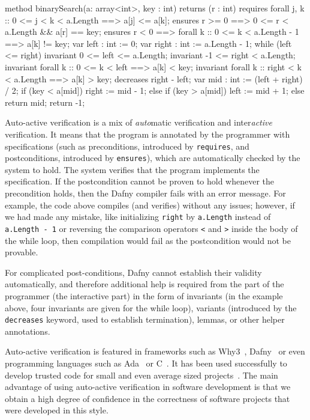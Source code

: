 \documentclass[12pt]{report}
\begin{document}
\begin{dafny}
method binarySearch(a: array<int>, key : int) returns (r : int)
   requires forall j, k :: 0 <= j < k < a.Length ==> a[j] <= a[k];
   ensures r >= 0 ==> 0 <= r < a.Length && a[r] == key;
   ensures r < 0 ==> forall k :: 0 <= k < a.Length - 1 ==> a[k] != key;
{
   var left : int := 0;
   var right : int := a.Length - 1;
   while (left <= right)
      invariant 0 <= left <= a.Length;
      invariant -1 <= right < a.Length;
      invariant forall k :: 0 <= k < left ==> a[k] < key;
      invariant forall k :: right < k < a.Length ==> a[k] > key;
      decreases right - left;
   {
      var mid : int := (left + right) / 2;
      if (key < a[mid]) {
         right := mid - 1;
      } else if (key > a[mid]) {
         left := mid + 1;
      } else {
         return mid;
      }
   }
   return -1;
 }
\end{dafny}

Auto-active verification is a mix of \emph{auto}matic verification and
inter\emph{active} verification. It means that the program is
annotated by the programmer with specifications (such as
preconditions, introduced by \texttt{requires}, and postconditions,
introduced by \texttt{ensures}), which are automatically checked by
the system to hold. The system verifies that the program implements
the specification. If the postcondition cannot be proven to hold
whenever the precondition holds, then the Dafny compiler fails with an
error message. For example, the code above compiles (and verifies)
without any issues; however, if we had made any mistake, like
initializing \texttt{right} by \texttt{a.Length} instead of
\texttt{a.Length - 1} or reversing the comparison operators \texttt{<}
and \texttt{>} inside the body of the while loop, then compilation
would fail as the postcondition would not be provable.

For complicated post-conditions, Dafny cannot establish their validity
automatically, and therefore additional help is required from the part
of the programmer (the interactive part) in the form of invariants (in
the example above, four invariants are given for the while loop),
variants (introduced by the \texttt{decreases} keyword, used to
establish termination), lemmas, or other helper
annotations.

Auto-active verification is featured in frameworks such as
Why3~\cite{why3}, Dafny~\cite{DBLP:journals/software/Leino17} or even
programming languages such as Ada~\cite{DBLP:journals/sttt/HoangMWC15}
or C~\cite{DBLP:conf/tphol/CohenDHLMSST09}. It has been used
successfully to develop trusted code for small and even average sized
projects~\cite{DBLP:conf/osdi/HawblitzelHLNPZZ14}. The main advantage
of using auto-active verification in software development is that we
obtain a high degree of confidence in the correctness of software
projects that were developed in this style.
\end{document}
